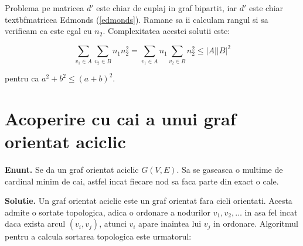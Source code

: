 Problema pe matricea $d'$ este chiar de cuplaj in graf bipartit, iar $d'$ este chiar textbf{matricea Edmonds} (\ref{edmonds}). Ramane sa ii calculam
rangul si sa verificam ca este egal cu $n_{2}$. Complexitatea acestei solutii este:

\begin{equation}
  \displaystyle\sum\limits_{v_{1} \in A} \displaystyle\sum\limits_{v_{2} \in B} n_{1}n_{2}^{2} = \displaystyle\sum\limits_{v_{1} \in A} n_{1} \displaystyle\sum\limits_{v_{2} \in B} n_{2}^{2} \leq |A||B|^{2}
\end{equation}

\noindent pentru ca $a^{2} + b^{2} \leq (a + b)^{2}$.

\pagebreak

\section{Acoperire cu cai a unui graf orientat aciclic}

\noindent \textbf{Enunt.} Se da un graf orientat aciclic $G(V, E)$. Sa se gaseasca o multime de cardinal minim de cai, astfel incat
fiecare nod sa faca parte din exact o cale.

\noindent \textbf{Solutie.} Un graf orientat aciclic este un graf orientat fara cicli orientati. Acesta admite o sortate topologica,
adica o ordonare a nodurilor $v_{1}, v_{2}, \ldots$ in asa fel incat daca exista arcul $(v_{i}, v_{j})$, atunci $v_{i}$ apare inaintea
lui $v_{j}$ in ordonare. Algoritmul pentru a calcula sortarea topologica este urmatorul:

\begin{algorithm}[H]
  \DontPrintSemicolon
  \;
\end{algorithm}

\begin{algorithm}[H]
  \DontPrintSemicolon
  \;
\end{algorithm}

\pagebreak

